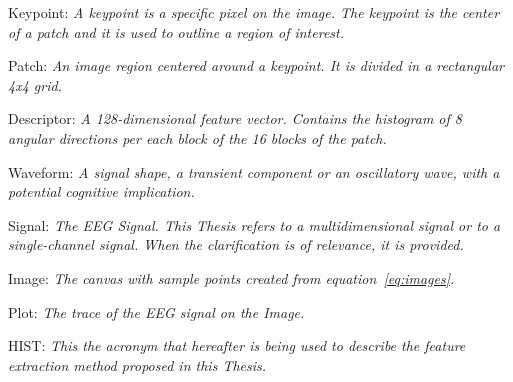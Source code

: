 \begin{story}
\theoremstyle{definition}

\begin{definition}{Keypoint:}
\label{def:Keypoint}
\textit{A keypoint is a specific pixel on the image.  The keypoint is the center of a patch and it is used to outline a region of interest.}
\end{definition}

\begin{definition}{Patch:}
\label{def:Patch}
\textit{An image region centered around a keypoint.  It is divided in a rectangular 4x4 grid.}
\end{definition}

\begin{definition}{Descriptor:}
\label{def:Descriptor}
\textit{A 128-dimensional \textit{feature} vector.  Contains the histogram of 8 angular directions per each block of the 16 blocks of the patch.}
\end{definition}

\begin{definition}{Waveform:}
\label{def:Waveform}
\textit{A signal shape, a transient component or an oscillatory wave, with a potential cognitive implication.}
\end{definition}

\begin{definition}{Signal:}
\label{def:Signal}
\textit{The EEG Signal. This Thesis refers to a multidimensional signal or to a single-channel signal. When the clarification is of relevance, it is provided.}
\end{definition}

\begin{definition}{Image:}
\label{def:Image}
\textit{The \textit{canvas} with sample points created from equation~\ref{eq:images}.}
\end{definition}

\begin{definition}{Plot:}
\label{def:Plot}
\textit{The trace of the EEG signal on the Image.}
\end{definition}

\begin{definition}{HIST:}
\label{def:Plot}
\textit{This the acronym that hereafter is being used to describe the feature extraction method proposed in this Thesis.}
\end{definition}

\end{story}


